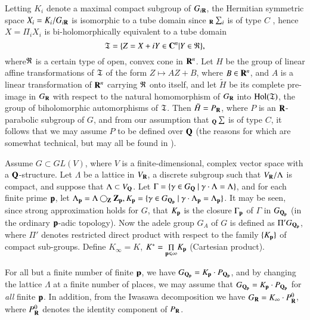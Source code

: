 Letting $K_i$ denote a maximal compact subgroup of $G_{i\mathbf{R}}$, the Hermitian symmetric space $X_i =K_i/G_{i\mathbf{R}}$ is isomorphic to a tube domain since ${}_{\mathbf{R}}\sum_i$ is of type $C$ \cite{art1-key7}, hence $X=\Pi_i X_i$ is bi-holomorphically equivalent to a tube domain
$$
\mathfrak{T} = \{Z = X + i Y \in  \mathbf{C}^n | Y \in \mathfrak{R} \},
$$
where\pageoriginale $\mathfrak{R}$ is a certain type of open, convex cone in $\mathbf{R}^n$. Let $H$ be the group of linear affine transformations of $\mathfrak{T}$ of the form $Z \longmapsto A Z + B$, where $B \in \mathbf{R}^n$, and $A$ is a linear transformation of $\mathbf{R}^n$ carrying $\mathfrak{R}$ onto itself, and let $\tilde{H}$ be its complete pre-image in $G_{\mathbf{R}}$ with respect to the natural homomorphism of $G_{\mathbf{R}}$ into $\operatorname{Hol}(\mathfrak{T})$, the group of biholomorphic automorphisms of $\mathfrak{T}$. Then $\tilde{H}=P_{\mathbf{R}}$, where $P$ is an $\mathbf{R}$-parabolic subgroup of $G$, and from our assumption that ${}_{\mathbf{Q}}\sum$ is of type $C$, it follows that we may assume $P$ to be defined over $\mathbf{Q}$ (the reasons for which are somewhat technical, but may all be found in \cite{art1-key4}).

Assume $G \subset G L (V)$, where $V$ is a finite-dimensional, complex vector space with a $\mathbf{Q}$-structure. Let $\Lambda$ be a lattice in $V_{\mathbf{R}}$, \iec a discrete subgroup such that $V_{\mathbf{R}}/\Lambda$ is compact, and suppose that $\Lambda \subset V_{\mathbf{Q}}$. Let $\Gamma =\{\gamma \in G_{\mathbf{Q}} ~|~ \gamma \cdot \Lambda = \Lambda \}$, and for each finite prime $\mathbf{p}$, let $\Lambda_{\mathbf{p}} = \Lambda \bigcirc_{\mathbf{Z}} \mathbf{Z}_{\mathbf{p}}, K_{\mathbf{p}} = \{\gamma \in G_{\mathbf{Q}_{\mathbf{p}}} ~|~ \gamma \cdot \Lambda_{\mathbf{p}} = \Lambda_{\mathbf{p}}\}$. It may be seen, since strong approximation holds for $G$, that $K_{\mathbf{p}}$ is the closure $\Gamma_{\mathbf{p}}$ of $\Gamma$ in $G_{\mathbf{Q}_{\mathbf{p}}}$ (in the ordinary $\mathbf{p}$-adic topology). Now the adele group $G_A$ of $G$ is defined as $\Pi' G_{\mathbf{Q}_{\mathbf{p}}}$, where $\Pi'$ denotes restricted direct product with respect to the family $\{K_{\mathbf{p}}\}$ of compact sub-groups. Define $K_{\infty} = K$, $K^{\ast} ={\displaystyle{\mathop{\Pi}\limits_{\mathbf{p}\leqslant \infty}}} K_{\mathbf{p}}$ (Cartesian product).

For all but a finite number of finite $\mathbf{p}$, we have $G_{\mathbf{Q}_{\mathbf{p}}} = K_{\mathbf{p}} \cdot P_{\mathbf{Q}_{\mathbf{p}}}$, and by changing the lattice $\Lambda$ at a finite number of places, we may assume \cite{art1-key5} that $G_{\mathbf{Q}_{\mathbf{p}}} = K_{\mathbf{p}} \cdot P_{\mathbf{Q}_{\mathbf{p}}}$ for \textit{all} finite $\mathbf{p}$. In addition, from the Iwasawa decomposition we have $G_{\mathbf{R}} = K_{\infty} \cdot P^0_{\mathbf{R}}$, where $P^0_{\mathbf{R}}$ denotes the identity component of $P_{\mathbf{R}}$.

